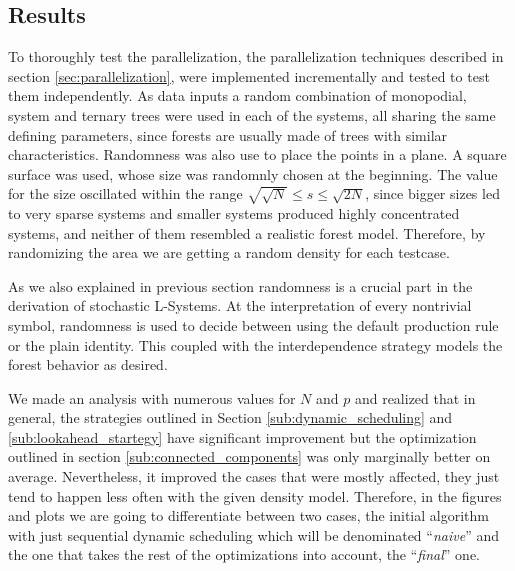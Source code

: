\documentclass[letterpaper,twoside,11pt]{article}
\begin{document}
\begin{multicols}{2}


\section{Results} %
\label{sec:results}

To thoroughly test the parallelization, the parallelization techniques described in section \ref{sec:parallelization}, were implemented incrementally and tested to test them independently. As data inputs a random combination of monopodial, system and ternary trees were used in each of the systems, all sharing the same defining parameters, since forests are usually made of trees with similar characteristics. Randomness was also use to place the points in a plane. A square surface was used, whose size was randomnly chosen at the beginning. The value for the size oscillated within the range $\sqrt{\sqrt{N}} \leq s \leq \sqrt{2N}$, since bigger sizes led to very sparse systems and smaller systems produced highly concentrated systems,  and neither of them resembled a realistic forest model. Therefore, by randomizing the area we are getting a random density for each testcase.

As we also explained in previous section randomness is a crucial part in the derivation of stochastic L-Systems. At the interpretation of every nontrivial symbol, randomness is used to decide between using the default production rule or the plain identity. This coupled with the interdependence strategy models the forest behavior as desired.

We made an analysis with numerous values for $N$ and $p$ and realized that in general, the strategies outlined in Section \ref{sub:dynamic_scheduling} and \ref{sub:lookahead_startegy} have significant improvement but the optimization outlined in section \ref{sub:connected_components} was only marginally better on average. Nevertheless, it improved the cases that were mostly affected, they just tend to happen less often with the given density model. Therefore, in the figures and plots we are going to differentiate between two cases, the initial algorithm with just sequential dynamic scheduling which will be denominated ``\emph{naive}'' and the one that takes the rest of the optimizations into account, the ``\emph{final}'' one.


\end{multicols}
\end{document}
